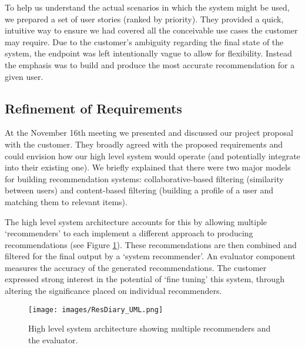\documentclass{l3proj}
\begin{document}
To help us understand the actual scenarios in which the system might be used, we prepared a set of user stories (ranked by priority). They provided a quick, intuitive way to ensure we had covered all the conceivable use cases the customer may require.
Due to the customer's ambiguity regarding the final state of the system, the endpoint was left intentionally vague to allow for flexibility. Instead the emphasis was to build and produce the most accurate recommendation for a given user. 


\subsection{Refinement of Requirements}
\label{sec:custrefineinitobj}

At the November 16th meeting we presented and discussed our project proposal with the customer. They broadly agreed with the proposed requirements and could envision how our high level system would operate (and potentially integrate into their existing one). We briefly explained that there were two major models for building recommendation systems: collaborative-based filtering (similarity between users) and content-based filtering (building a profile of a user and matching them to relevant items). 

The high level system architecture accounts for this by allowing multiple `recommenders' to each implement a different approach to producing recommendations (see Figure \ref{fig:uml}). 
These recommendations are then combined and filtered for the final output by a `system recommender'. An evaluator component measures the accuracy of the generated recommendations. The customer expressed strong interest in the potential of `fine tuning' this system, through altering the significance placed on individual recommenders. 

\begin{figure}[ht]
\centering
\texttt{[image: images/ResDiary\_UML.png]}
\caption{High level system architecture showing multiple recommenders and the evaluator.}
\label{fig:uml}
\end{figure}
\end{document}
